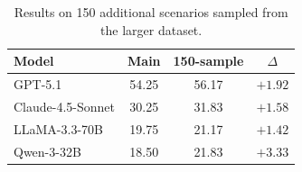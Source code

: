 \begin{table}[t]
\centering
\small
\setlength{\tabcolsep}{5pt}
\begin{tabular}{lccc}
\toprule
\textbf{Model} & \textbf{Main} & \textbf{150-sample} & $\Delta$ \\
\midrule
GPT-5.1 & 54.25 & 56.17 & $+1.92$ \\
Claude-4.5-Sonnet & 30.25 & 31.83 & $+1.58$ \\
LLaMA-3.3-70B & 19.75 & 21.17 & $+1.42$ \\
Qwen-3-32B & 18.50 & 21.83 & $+3.33$ \\
\bottomrule
\end{tabular}
\caption{Results on 150 additional scenarios sampled from the larger dataset.}
\label{tab:additional_dataset_performance}
\end{table}